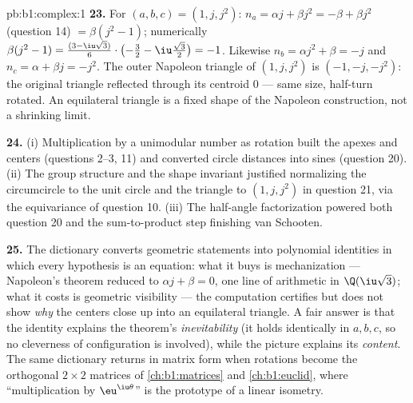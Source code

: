 \begin{solution}{pb:b1:complex:1}
\textbf{23.} For $(a, b, c) = (1, j, j^2)$: $n_a = \alpha j +
\beta j^2 = -\beta + \beta j^2$ (question 14) $= \beta(j^2 - 1)$;
numerically $\beta(j^2 - 1) = \frac{(3 - \iu\sqrt3)}6 \cdot
\bigl(-\frac32 - \iu\frac{\sqrt3}2\bigr) = -1$. Likewise $n_b =
\alpha j^2 + \beta = -j$ and $n_c = \alpha + \beta j = -j^2$. The
outer Napoleon triangle of $(1, j, j^2)$ is $(-1, -j, -j^2)$: the
original triangle reflected through its centroid $0$ --- same
size, half-turn rotated. An equilateral triangle is a fixed shape
of the Napoleon construction, not a shrinking limit.

\textbf{24.} (i) Multiplication by a unimodular number as rotation
built the apexes and centers (questions 2--3, 11) and converted
circle distances into sines (question 20). (ii) The group
structure and the shape invariant justified normalizing the
circumcircle to the unit circle and the triangle to $(1, j, j^2)$
in question 21, via the equivariance of question 10. (iii) The
half-angle factorization powered both question 20 and the
sum-to-product step finishing van Schooten.

\textbf{25.} The dictionary converts geometric statements into
polynomial identities in which every hypothesis is an equation:
what it buys is mechanization --- Napoleon's theorem reduced to
$\alpha j + \beta = 0$, one line of arithmetic in
$\Q(\iu\sqrt3)$; what it costs is geometric visibility --- the
computation certifies but does not show \emph{why} the centers
close up into an equilateral triangle. A fair answer is that the
identity explains the theorem's \emph{inevitability} (it holds
identically in $a, b, c$, so no cleverness of configuration is
involved), while the picture explains its \emph{content}. The same
dictionary returns in matrix form when rotations become the
orthogonal $2 \times 2$ matrices of \cref{ch:b1:matrices} and
\cref{ch:b1:euclid}, where ``multiplication by
$\eu^{\iu\theta}$'' is the prototype of a linear isometry.
\end{solution}
